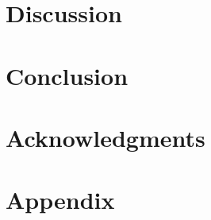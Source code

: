 \documentclass[preprint,12pt]{elsarticle} %
\begin{document}
\section{Discussion}
\label{ch:discussion}


\section{Conclusion}
\label{ch:conclusion}


\section{Acknowledgments}
\label{ch:acknowledgments}


\section{Appendix}
\label{ch:appendix}



   
  
\end{document}
